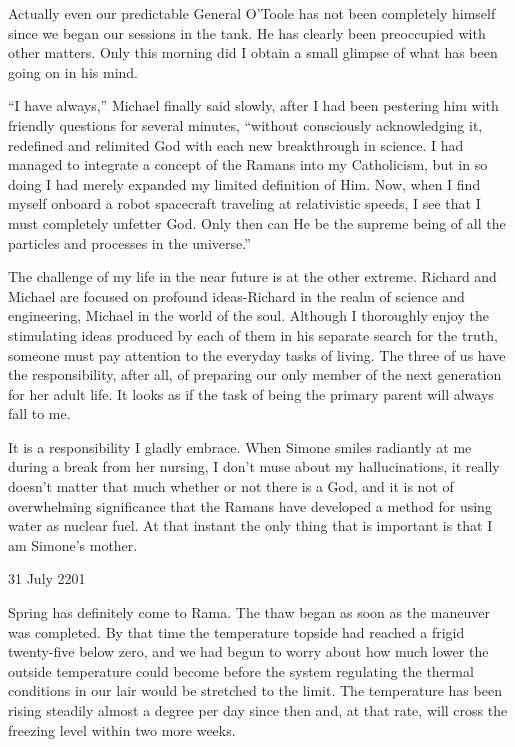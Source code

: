 \documentclass[]{article}
\begin{document}
Actually even our predictable General O’Toole has not been completely himself since we began our sessions in the tank.  He has clearly been preoccupied with other matters.  Only this morning did I obtain a small glimpse of what has been going on in his mind.

“I have always,” Michael finally said slowly, after I had been pestering him with friendly questions for several minutes, “without consciously acknowledging it, redefined and relimited God with each new breakthrough in science.  I had managed to integrate a concept of the Ramans into my Catholicism, but in so doing I had merely expanded my limited definition of Him.  Now, when I find myself onboard a robot spacecraft traveling at relativistic speeds, I see that I must completely unfetter God.  Only then can He be the supreme being of all the particles and processes in the universe.”

The challenge of my life in the near future is at the other extreme.  Richard and Michael are focused on profound ideas-Richard in the realm of science and engineering, Michael in the world of the soul.  Although I thoroughly enjoy the stimulating ideas produced by each of them in his separate search for the truth, someone must pay attention to the everyday tasks of living.  The three of us have the responsibility, after all, of preparing our only member of the next generation for her adult life.  It looks as if the task of being the primary parent will always fall to me.

It is a responsibility I gladly embrace.  When Simone smiles radiantly at me during a break from her nursing, I don’t muse about my hallucinations, it really doesn’t matter that much whether or not there is a God, and it is not of overwhelming significance that the Ramans have developed a method for using water as nuclear fuel.  At that instant the only thing that is important is that I am Simone’s mother.

31 July 2201

Spring has definitely come to Rama.  The thaw began as soon as the maneuver was completed.  By that time the temperature topside had reached a frigid twenty-five below zero, and we had begun to worry about how much lower the outside temperature could become before the system regulating the thermal conditions in our lair would be stretched to the limit.  The temperature has been rising steadily almost a degree per day since then and, at that rate, will cross the freezing level within two more weeks.
\end{document}
